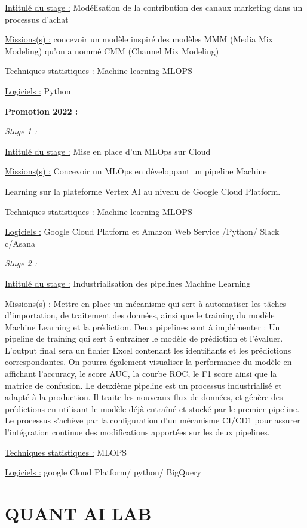 \documentclass[
  letterpaper,
  DIV=11,
  numbers=noendperiod]{scrreprt}
\begin{document}
\uline{Intitulé du stage :} Modélisation de la contribution des canaux
marketing dans un processus d'achat

\uline{Missions(s) :} concevoir un modèle inspiré des modèles MMM (Media
Mix Modeling) qu'on a nommé CMM (Channel Mix Modeling)

\uline{Techniques statistiques :} Machine learning MLOPS

\uline{Logiciels :} Python

\textbf{Promotion 2022 :}

\emph{Stage 1 :}

\uline{Intitulé du stage :} Mise en place d'un MLOps sur Cloud

\uline{Missions(s) :} Concevoir un MLOps en développant un pipeline
Machine

Learning sur la plateforme Vertex AI au niveau de Google Cloud Platform.

\uline{Techniques statistiques :} Machine learning MLOPS

\uline{Logiciels :} Google Cloud Platform et Amazon Web Service /Python/
Slack c/Asana

\emph{Stage 2 :}

\uline{Intitulé du stage :} Industrialisation des pipelines Machine
Learning

\uline{Missions(s) :} Mettre en place un mécanisme qui sert à
automatiser les tâches d'importation, de traitement des données, ainsi
que le training du modèle Machine Learning et la prédiction. Deux
pipelines sont à implémenter : Un pipeline de training qui sert à
entraîner le modèle de prédiction et l'évaluer. L'output final sera un
fichier Excel contenant les identifiants et les prédictions
correspondantes. On pourra également visualiser la performance du modèle
en affichant l'accuracy, le score AUC, la courbe ROC, le F1 score ainsi
que la matrice de confusion. Le deuxième pipeline est un processus
industrialisé et adapté à la production. Il traite les nouveaux flux de
données, et génère des prédictions en utilisant le modèle déjà entraîné
et stocké par le premier pipeline. Le processus s'achève par la
configuration d'un mécanisme CI/CD1 pour assurer l'intégration continue
des modifications apportées sur les deux pipelines.

\uline{Techniques statistiques :} MLOPS

\uline{Logiciels :} google Cloud Platform/ python/ BigQuery

\hypertarget{quant-ai-lab}{%
\section{\texorpdfstring{\textbf{QUANT AI
LAB}}{QUANT AI LAB}}\label{quant-ai-lab}}
\end{document}
